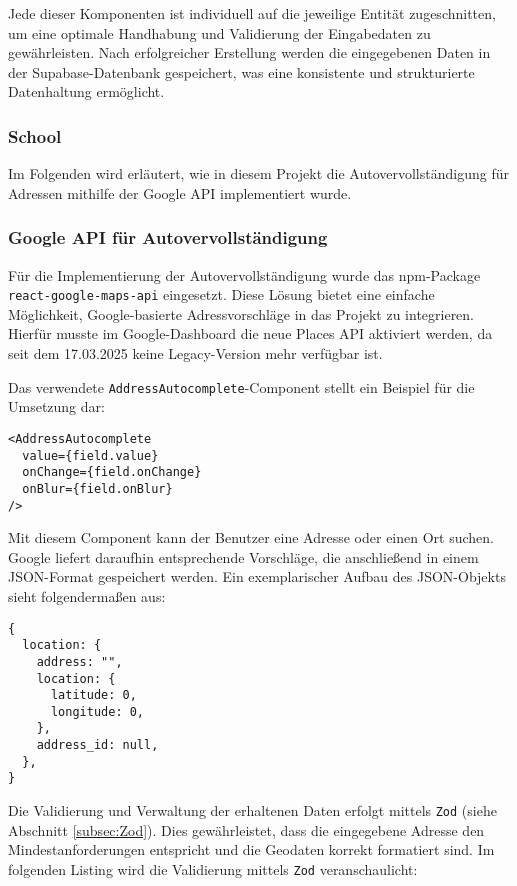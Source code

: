 \begin{inhalt}
Jede dieser Komponenten ist individuell auf die jeweilige Entität zugeschnitten, um eine optimale Handhabung und Validierung der Eingabedaten zu gewährleisten. Nach erfolgreicher Erstellung werden die eingegebenen Daten in der Supabase-Datenbank gespeichert, was eine konsistente und strukturierte Datenhaltung ermöglicht.

\subsubsection{School}






Im Folgenden wird erläutert, wie in diesem Projekt die Autovervollständigung für Adressen mithilfe der Google API implementiert wurde.

\subsubsection{Google API für Autovervollständigung}

Für die Implementierung der Autovervollständigung wurde das npm-Package \texttt{react-google-maps-api} eingesetzt. Diese Lösung bietet eine einfache Möglichkeit, Google-basierte Adressvorschläge in das Projekt zu integrieren. Hierfür musste im Google-Dashboard die neue Places API aktiviert werden, da seit dem 17.03.2025 keine Legacy-Version mehr verfügbar ist.

Das verwendete \texttt{AddressAutocomplete}-Component stellt ein Beispiel für die Umsetzung dar:

\begin{lstlisting}[style=mytsx]
<AddressAutocomplete
  value={field.value}
  onChange={field.onChange}
  onBlur={field.onBlur}
/>
\end{lstlisting}

Mit diesem Component kann der Benutzer eine Adresse oder einen Ort suchen. Google liefert daraufhin entsprechende Vorschläge, die anschließend in einem JSON-Format gespeichert werden. Ein exemplarischer Aufbau des JSON-Objekts sieht folgendermaßen aus:

\begin{lstlisting}[style=myjson]
{
  location: {
    address: "",
    location: {
      latitude: 0,
      longitude: 0,
    },
    address_id: null,
  },
}
\end{lstlisting}

Die Validierung und Verwaltung der erhaltenen Daten erfolgt mittels \texttt{Zod} (siehe Abschnitt \ref{subsec:Zod}). Dies gewährleistet, dass die eingegebene Adresse den Mindestanforderungen entspricht und die Geodaten korrekt formatiert sind. Im folgenden Listing wird die Validierung mittels \texttt{Zod} veranschaulicht:


\end{inhalt}
